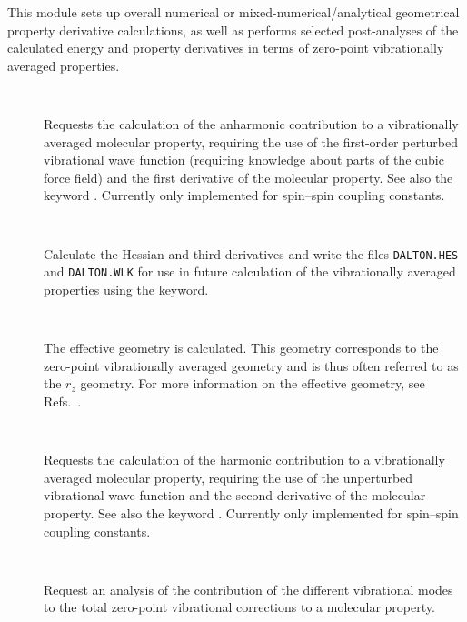 This module sets up overall numerical or mixed-numerical/analytical
geometrical property derivative calculations, as well as performs selected
post-analyses of the calculated energy and property derivatives in
terms of zero-point vibrationally averaged properties.

\begin{description}

\item[]\verb| |\newline

Requests the calculation of the anharmonic contribution to a
vibrationally averaged molecular property, requiring the use of the
first-order perturbed vibrational wave function (requiring knowledge
about parts of the cubic force field) and the first derivative of the
molecular property. See also the keyword . Currently only
implemented for spin--spin coupling constants.

\item[]\verb| |\newline

Calculate the Hessian and third derivatives and write the files
\verb|DALTON.HES| and \verb|DALTON.WLK| for use in future 
calculation of the vibrationally averaged properties using the
 keyword.

\item[]\verb| |\newline

The effective geometry is calculated. This geometry corresponds to the
zero-point vibrationally averaged geometry and is thus often referred
to as the $r_z$ geometry. For more information on the effective
geometry, see Refs.~\cite{poakrprtjcp112,krpoaprtjcp112}.

\item[]\verb| |\newline

Requests the calculation of the harmonic contribution to a
vibrationally averaged molecular property, requiring the use of the
unperturbed vibrational wave function and the second derivative of the
molecular property. See also the keyword . Currently only
implemented for spin--spin coupling constants.

\item[]\verb| |\newline

Request an analysis of the contribution of the different vibrational modes
to the total zero-point vibrational corrections to a molecular property.


\end{description}
